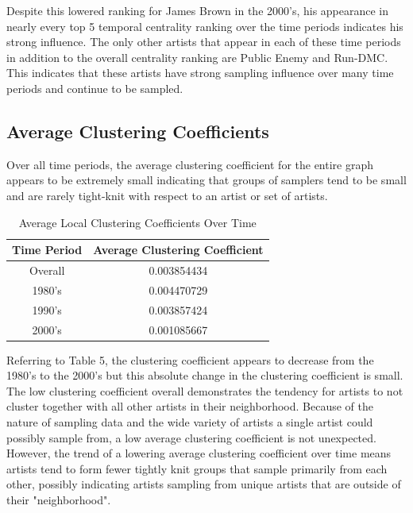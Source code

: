 \documentclass[pageno]{jpaper}
\begin{document}
Despite this lowered ranking for James Brown in the 2000's, his appearance in nearly every top 5 temporal centrality ranking over the time periods indicates his strong influence. The only other artists that appear in each of these time periods in addition to the overall centrality ranking are Public Enemy and Run-DMC. This indicates that these artists have strong sampling influence over many time periods and continue to be sampled.
\subsection{Average Clustering Coefficients}
Over all time periods, the average clustering coefficient for the entire graph appears to be extremely small indicating that groups of samplers tend to be small and are rarely tight-knit with respect to an artist or set of artists.
\begin{table}[H]
\centering
\begin{tabular}{|c|c|}
\hline
\textbf{Time Period} & \textbf{Average Clustering Coefficient} \\ \hline
Overall & 0.003854434 \\ \hline
1980's & 0.004470729 \\ \hline
1990's & 0.003857424 \\ \hline
2000's & 0.001085667 \\ \hline
\end{tabular}
\caption{Average Local Clustering Coefficients Over Time}
\label{table:table5}
\end{table}
Referring to Table 5, the clustering coefficient appears to decrease from the 1980's to the 2000's but this absolute change in the clustering coefficient is small. The low clustering coefficient overall demonstrates the tendency for artists to not cluster together with all other artists in their neighborhood. Because of the nature of sampling data and the wide variety of artists a single artist could possibly sample from, a low average clustering coefficient is not unexpected. However, the trend of a lowering average clustering coefficient over time means artists tend to form fewer tightly knit groups that sample primarily from each other, possibly indicating artists sampling from unique artists that are outside of their "neighborhood".
\end{document}
